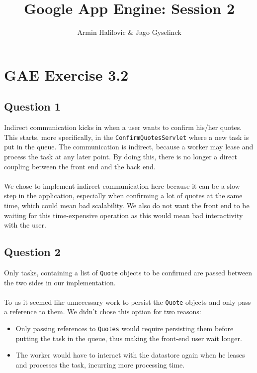 \documentclass[]{article}
\title{Google App Engine: Session 2 }
\author{Armin Halilovic \& Jago Gyselinck}
\begin{document}
\maketitle

\section{GAE Exercise 3.2}

\subsection{Question 1}

Indirect communication kicks in when a user wants to confirm his/her quotes. This starts, more specifically, in the \texttt{ConfirmQuotesServlet} where a new task is put in the queue. The communication is indirect, because a worker may lease and process the task at any later point. By doing this, there is no longer a direct coupling between the front end and the back end.\\\\
We chose to implement indirect communication here because it can be a slow step in the application, especially when confirming a lot of quotes at the same time, which could mean bad scalability. We also do not want the front end to be waiting for this time-expensive operation as this would mean bad interactivity with the user.

\subsection{Question 2}
Only tasks, containing a list of \texttt{Quote} objects to be confirmed are passed between the two sides in our implementation. \\\\
To us it seemed like unnecessary work to persist the \texttt{Quote} objects and only pass a reference to them. We didn't chose this option for two reasons:

\begin{itemize}
	\item Only passing references to \texttt{Quotes} would require persisting them before putting the task in the queue, thus making the front-end user wait longer.
	\item The worker would have to interact with the datastore again when he leases and processes the task, incurring more processing time.
\end{itemize}
\end{document}
